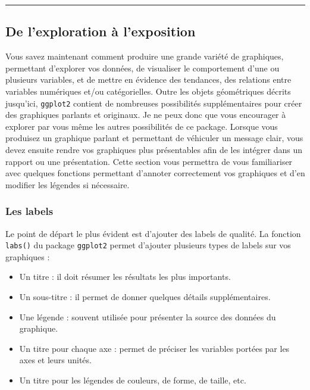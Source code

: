\documentclass[a4paperpaper,]{article}
\providecommand{\tightlist}{%
  \setlength{\itemsep}{0pt}\setlength{\parskip}{0pt}}
\begin{document}
\begin{center}\rule{0.5\linewidth}{\linethickness}\end{center}

\hypertarget{de-lexploration-a-lexposition}{%
\subsection{De l'exploration à l'exposition}\label{de-lexploration-a-lexposition}}

Vous savez maintenant comment produire une grande variété de graphiques, permettant d'explorer vos données, de visualiser le comportement d'une ou plusieurs variables, et de mettre en évidence des tendances, des relations entre variables numériques et/ou catégorielles. Outre les objets géométriques décrits jusqu'ici, \texttt{ggplot2} contient de nombreuses possibilités supplémentaires pour créer des graphiques parlants et originaux. Je ne peux donc que vous encourager à explorer par vous même les autres possibilités de ce package.
Lorsque vous produisez un graphique parlant et permettant de véhiculer un message clair, vous devez ensuite rendre vos graphiques plus présentables afin de les intégrer dans un rapport ou une présentation. Cette section vous permettra de vous familiariser avec quelques fonctions permettant d'annoter correctement vos graphiques et d'en modifier les légendes si nécessaire.

\hypertarget{les-labels}{%
\subsubsection{Les labels}\label{les-labels}}

Le point de départ le plus évident est d'ajouter des labels de qualité. La fonction \texttt{labs()} du package \texttt{ggplot2} permet d'ajouter plusieurs types de labels sur vos graphiques :

\begin{itemize}
\tightlist
\item
  Un titre : il doit résumer les résultats les plus importants.
\item
  Un sous-titre : il permet de donner quelques détails supplémentaires.
\item
  Une légende : souvent utilisée pour présenter la source des données du graphique.
\item
  Un titre pour chaque axe : permet de préciser les variables portées par les axes et leurs unités.
\item
  Un titre pour les légendes de couleurs, de forme, de taille, etc.
\end{itemize}
\end{document}
